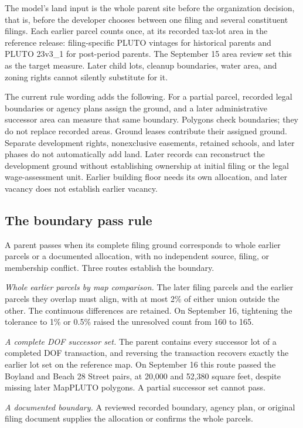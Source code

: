 The model's land input is the whole parent site before the organization
decision, that is, before the developer chooses between one filing and several
constituent filings. Each earlier parcel counts once, at its recorded tax-lot
area in the reference release: filing-specific PLUTO vintages for historical
parents and PLUTO 23v3\_1 for post-period parents. The September 15 area
review set this as the target measure. Later child lots, cleanup boundaries,
water area, and zoning rights cannot silently substitute for it.

The current rule wording adds the following. For a partial parcel, recorded
legal boundaries or agency plans assign the ground, and a later administrative
successor area can measure that same boundary. Polygons check boundaries; they
do not replace recorded areas. Ground leases contribute their assigned ground.
Separate development rights, nonexclusive easements, retained schools, and
later phases do not automatically add land. Later records can reconstruct the
development ground without establishing ownership at initial filing or the
legal wage-assessment unit. Earlier building floor needs its own allocation,
and later vacancy does not establish earlier vacancy.

\subsection*{The boundary pass rule}

A parent passes when its complete filing ground corresponds to whole earlier
parcels or a documented allocation, with no independent source, filing, or
membership conflict. Three routes establish the boundary.

\textit{Whole earlier parcels by map comparison.} The later filing parcels and
the earlier parcels they overlap must align, with at most 2\% of either union
outside the other. The continuous differences are retained. On September 16,
tightening the tolerance to 1\% or 0.5\% raised the unresolved count from 160
to 165.

\textit{A complete DOF successor set.} The parent contains every successor lot
of a completed DOF transaction, and reversing the transaction recovers exactly
the earlier lot set on the reference map. On September 16 this route passed the
Boyland and Beach 28 Street pairs, at 20,000 and 52,380 square feet, despite
missing later MapPLUTO polygons. A partial successor set cannot pass.

\textit{A documented boundary.} A reviewed recorded boundary, agency plan, or
original filing document supplies the allocation or confirms the whole parcels.

